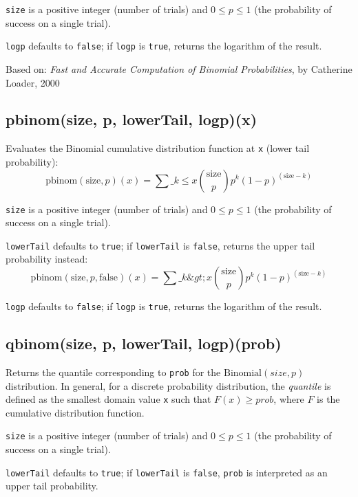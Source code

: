 \documentclass{article}
\begin{document}
\texttt{size} is a positive integer (number of trials) and $0 \leq p \leq 1$
(the probability of success on a single trial).


\texttt{logp} defaults to \texttt{false}; if \texttt{logp} is \texttt{true}, returns the
logarithm of the result.


Based on: \emph{Fast and Accurate Computation of Binomial Probabilities},
by Catherine Loader, 2000


    \subsection*{pbinom(size, p, lowerTail, logp)(x)}
    Evaluates the Binomial cumulative distribution
function at \texttt{x} (lower tail probability):
$$\textrm{pbinom}(\textrm{size}, p)(x) = \sum\_{k \leq x} \binom{\textrm{size}}{p}p^{k}(1-p)^{(\textrm{size}-k)}$$


\texttt{size} is a positive integer (number of trials) and $0 \leq p \leq 1$
(the probability of success on a single trial).


\texttt{lowerTail} defaults to \texttt{true}; if \texttt{lowerTail} is \texttt{false}, returns
the upper tail probability instead:
$$\textrm{pbinom}(\textrm{size}, p, \textrm{false})(x) = \sum\_{k\&gt;x} \binom{\textrm{size}}{p}p^{k}(1-p)^{(\textrm{size}-k)}$$


\texttt{logp} defaults to \texttt{false}; if \texttt{logp} is \texttt{true}, returns the logarithm
of the result.


    \subsection*{qbinom(size, p, lowerTail, logp)(prob)}
    Returns the quantile corresponding to \texttt{prob}
for the $\textrm{Binomial}(size, p)$ distribution.
In general, for a discrete probability
distribution, the \emph{quantile} is defined as the smallest domain value
\texttt{x} such that $F(x) \geq prob$, where $F$ is the cumulative
distribution function.


\texttt{size} is a positive integer (number of trials) and $0 \leq p \leq 1$
(the probability of success on a single trial).


\texttt{lowerTail} defaults to \texttt{true}; if \texttt{lowerTail} is \texttt{false}, \texttt{prob} is
interpreted as an upper tail probability.
\end{document}
